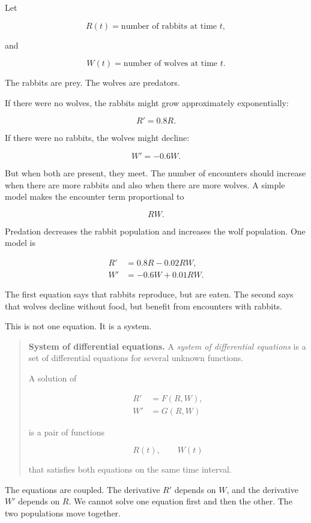 Let

\[
R(t)=\text{number of rabbits at time }t,
\]

and

\[
W(t)=\text{number of wolves at time }t.
\]

The rabbits are prey.  The wolves are predators.

If there were no wolves, the rabbits might grow approximately exponentially:

\[
R'=0.8R.
\]

If there were no rabbits, the wolves might decline:

\[
W'=-0.6W.
\]

But when both are present, they meet.  The number of encounters should increase when
there are more rabbits and also when there are more wolves.  A simple model makes the
encounter term proportional to

\[
RW.
\]

Predation decreases the rabbit population and increases the wolf population.  One model
is

\[
\boxed{
\begin{aligned}
R'&=0.8R-0.02RW,\\
W'&=-0.6W+0.01RW.
\end{aligned}
}
\]

The first equation says that rabbits reproduce, but are eaten.  The second says that wolves
decline without food, but benefit from encounters with rabbits.

This is not one equation.  It is a system.

\begin{quote}
\textbf{System of differential equations.}
A \emph{system of differential equations} is a set of differential equations for several
unknown functions.

A solution of

\[
\begin{aligned}
R'&=F(R,W),\\
W'&=G(R,W)
\end{aligned}
\]

is a pair of functions

\[
R(t),\qquad W(t)
\]

that satisfies both equations on the same time interval.
\end{quote}

The equations are coupled.  The derivative \(R'\) depends on \(W\), and the derivative
\(W'\) depends on \(R\).  We cannot solve one equation first and then the other.  The two
populations move together.


